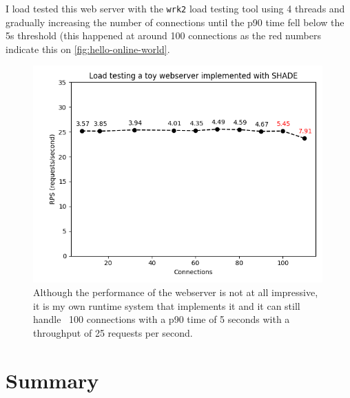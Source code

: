 \documentclass[class=article, crop=false]{standalone}
\begin{document}
I load tested this web server with the \lstinline|wrk2| load testing tool
\cite{wrk2-website} using 4 threads and gradually increasing the number of
connections until the p90 time fell below the 5s threshold (this happened at
around 100 connections as the red numbers indicate this on
\autoref{fig:hello-online-world}.

\begin{figure}
    \centering
    \includegraphics[width=30em]{eval_plots/webserver.png}
    \caption{Although the performance of the webserver is not at all impressive,
    it is my own runtime system that implements it and it can still handle ~100
    connections with a p90 time of 5 seconds with a throughput of 25 requests
    per second.}
    \label{fig:hello-online-world}
\end{figure}

\section{Summary}
\end{document}
